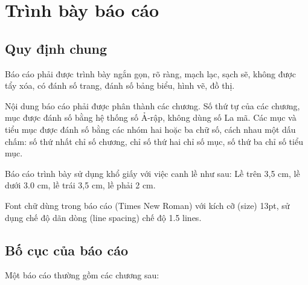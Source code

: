 \chapter{Trình bày báo cáo}
\label{Chapter2}

\section{Quy định chung}
Báo cáo phải được trình bày ngắn gọn, rõ ràng, mạch lạc, sạch sẽ, không được tẩy xóa, có đánh số trang, đánh số bảng biểu, hình vẽ, đồ thị. 

Nội dung báo cáo phải được phân thành các chương. Số thứ tự của các chương, mục được đánh số bằng hệ thống số Ả-rập, không dùng số La mã. Các mục và tiểu mục được đánh số bằng các nhóm hai hoặc ba chữ số, cách nhau một dấu chấm: số thứ nhất chỉ số chương, chỉ số thứ hai chỉ số mục, số thứ ba chỉ số tiểu mục.

Báo cáo trình bày sử dụng khổ giấy với việc canh lề như sau: Lề trên 3,5 cm, lề dưới 3.0 cm, lề trái 3,5 cm, lề phải 2 cm. 

Font chữ dùng trong báo cáo (Times New Roman) với kích cỡ (size) 13pt, sử dụng chế độ dãn dòng (line spacing) chế độ 1.5 lines.

\section{Bố cục của báo cáo}

Một báo cáo thường gồm các chương sau:

